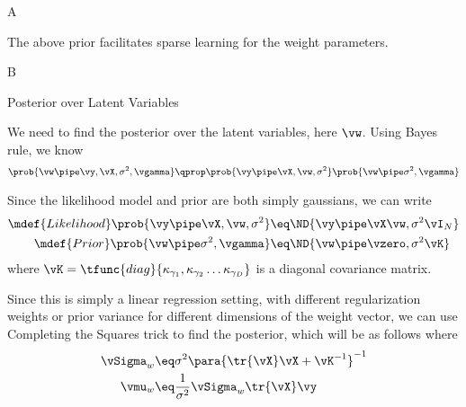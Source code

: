 \documentclass{article}
\begin{document}
\makeheader

\begin{question}

	\begin{qpart}{A}

		The above prior facilitates sparse learning for the weight parameters.

	\end{qpart}

	\begin{qpart}{B}

		\begin{qsubsection}{Posterior over Latent Variables}

			We need to find the posterior over the latent variables, here $\vw$. Using Bayes rule, we know
			\begin{align*}
				\prob{\vw \pipe \vy, \vX, \sigma^2, \vgamma}	\qprop	\prob{\vy \pipe \vX, \vw, \sigma^2} \prob{\vw \pipe \sigma^2, \vgamma}
			\end{align*}

			Since the likelihood model and prior are both simply gaussians, we can write
			\begin{align*}
				\mdef{Likelihood}	\prob{\vy \pipe \vX, \vw, \sigma^2}	&\eq	\ND{\vy \pipe \vX \vw, \sigma^2 \vI_N} \\
				\mdef{Prior}		\prob{\vw \pipe \sigma^2, \vgamma}	&\eq	\ND{\vw \pipe \vzero, \sigma^2 \vK}
			\end{align*}
			where $\vK = \tfunc{diag}{\kappa_{\gamma_1}, \kappa_{\gamma_2} \dots \kappa_{\gamma_D}}$ is a diagonal covariance matrix.

			Since this is simply a linear regression setting, with different regularization weights or prior variance for different dimensions of the weight vector, we can use Completing the Squares trick to find the posterior, which will be as follows
			where
			\begin{align*}
				\vSigma_w	&\eq	\sigma^2 \para{\tr{\vX} \vX + \vK^{-1}}^{-1} \\
				\vmu_w		&\eq	\frac{1}{\sigma^2}  \vSigma_w \tr{\vX} \vy
			\end{align*}

		\end{qsubsection}


\end{qpart}
\end{question}
\end{document}
